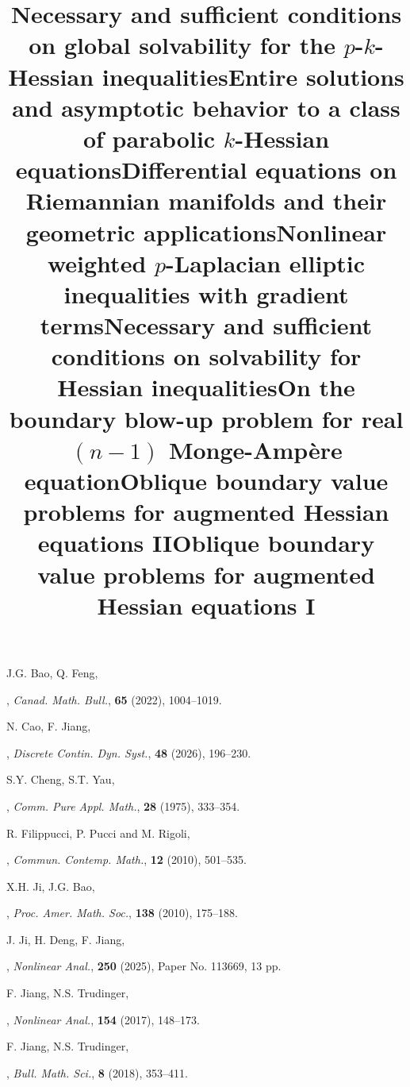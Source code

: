 \documentclass[a4paper,11pt]{amsart}
\theoremstyle{plain}
\theoremstyle{remark}
\numberwithin{equation}{section}
\numberwithin{figure}{section}
\numberwithin{remark}{section}
\begin{document}
\begin{sloppypar}
\begin{thebibliography}{99}



\newblock J.G. Bao, Q. Feng, 
\newblock \title {Necessary and sufficient conditions on global solvability for the $p$-$k$-Hessian inequalities}, 
\newblock \emph{Canad. Math. Bull.}, \textbf{65} (2022), 1004--1019.


\newblock N. Cao,  F. Jiang,
\newblock \title {Entire solutions and asymptotic behavior to a class of parabolic $k$-Hessian equations},
\newblock \emph{Discrete Contin. Dyn. Syst.}, \textbf{48} (2026), 196--230.





\newblock S.Y. Cheng,  S.T. Yau,
\newblock \title {Differential equations on Riemannian manifolds and their geometric applications},
\newblock \emph{Comm. Pure Appl. Math.}, \textbf{28} (1975), 333--354.




\newblock R. Filippucci, P. Pucci and M. Rigoli, 
\newblock \title {Nonlinear weighted $p$-Laplacian elliptic inequalities with gradient terms}, 
\newblock \emph{Commun. Contemp. Math.}, \textbf{12} (2010), 501--535.









\newblock X.H. Ji, J.G. Bao,
\newblock \title{Necessary and sufficient conditions on solvability for Hessian inequalities},
\newblock \emph{Proc. Amer. Math. Soc.}, \textbf{138} (2010), 175--188.


\newblock J. Ji, H. Deng, F. Jiang,
\newblock \title{On the boundary blow-up problem for real $(n-1)$ Monge-Amp\`ere equation},
\newblock \emph{Nonlinear Anal.}, \textbf{250} (2025), Paper No. 113669, 13 pp.



\newblock F. Jiang, N.S. Trudinger,
\newblock \title{Oblique boundary value problems for augmented Hessian equations II},
\newblock \emph{Nonlinear Anal.},
\textbf{154} (2017), 148--173.

\newblock F. Jiang, N.S. Trudinger,
\newblock \title{Oblique boundary value problems for augmented Hessian equations I},
\newblock \emph{Bull. Math. Sci.},
\textbf{8} (2018), 353--411.


\end{thebibliography}
\end{sloppypar}
\end{document}
